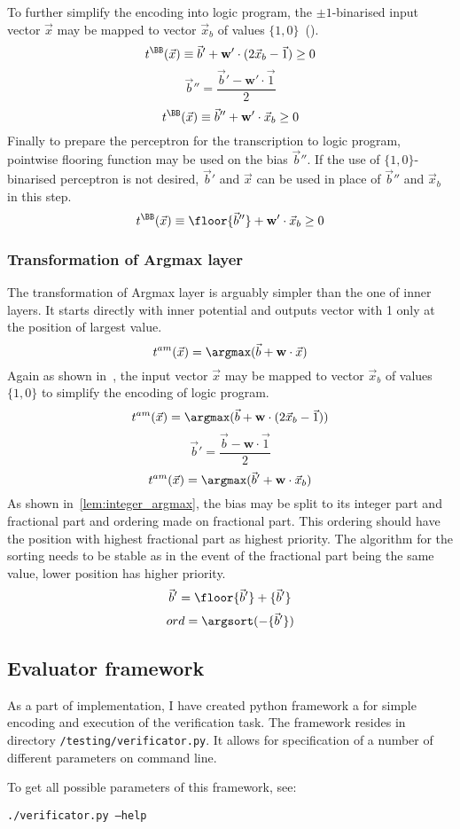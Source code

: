 To further simplify the encoding into logic program, the $\pm 1$-binarised
input vector $\vec x$ may be mapped to vector $\vec x_b$
of values $\{1, 0\}$~().
\[t^\BB(\vec x) \equiv \vec b' + \mathbf{w}'\cdot (2\vec x_b - \vec 1) \geq 0\]
\[\vec b'' = \frac{\vec b' - \mathbf{w}'\cdot \vec 1}{2}\]
\[t^\BB(\vec x) \equiv \vec b'' + \mathbf{w}'\cdot \vec x_b \geq 0\]
Finally to prepare the perceptron for the transcription to logic program,
pointwise flooring function may be used on the bias $\vec b''$.
If the use of $\{1, 0\}$-binarised perceptron is not desired, $\vec b'$ and $\vec x$
can be used in place of $\vec b''$ and $\vec x_b$ in this step.
\[t^\BB(\vec x) \equiv \floor{\vec b''} + \mathbf{w}'\cdot \vec x_b \geq 0\]

\subsubsection{Transformation of Argmax layer}\label{sec:pyt_argmax}

The transformation of Argmax layer is arguably simpler than the one of
inner layers. It starts directly with inner potential and outputs vector
with 1 only at the position of largest value.
\[t^{am}(\vec x) = \argmax(\vec b + \mathbf{w}\cdot \vec x)\]
Again as shown in~, the input vector $\vec x$
may be mapped to vector $\vec x_b$ of values $\{1,0\}$ to simplify the encoding
of logic program.
\[t^{am}(\vec x) = \argmax(\vec b + \mathbf{w}\cdot (2\vec x_b - \vec 1))\]
\[\vec b' = \frac{\vec b - \mathbf{w}\cdot \vec 1}{2}\]
\[t^{am}(\vec x) = \argmax(\vec b' + \mathbf{w}\cdot \vec x_b)\]
As shown in~\cref{lem:integer_argmax}, the bias may be split to its integer part
and fractional part and ordering made on fractional part. This ordering should have
the position with highest fractional part as highest priority. The algorithm for the
sorting needs to be stable as in the event of the fractional part being the same value,
lower position has higher priority.
\[\vec b' = \floor{\vec b'} + \{\vec b'\}\]
\[ord = \argsort(-\{\vec b'\})\]

\subsection{Evaluator framework}\label{sec:python_pars}

As a part of implementation, I have created python framework
a for simple encoding and execution of the verification task.
The framework resides in directory \texttt{/testing/verificator.py}.
It allows for specification of a number of different parameters
on command line.

To get all possible parameters of this framework, see:
\begin{center}
    \texttt{./verificator.py --help}
\end{center}

